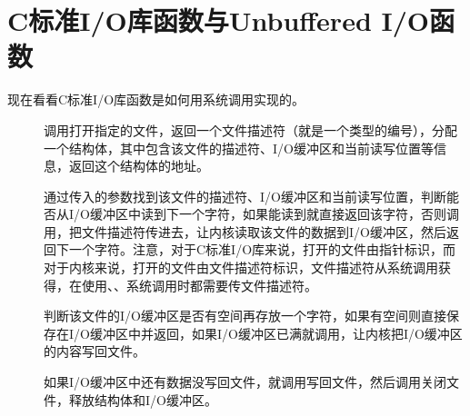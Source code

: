 


\section{C标准I/O库函数与Unbuffered I/O函数}
%
现在看看C标准I/\BookSplit{}O库函数是如何用系统调用实现的。


\begin{description}
\item[{}]


调用打开指定的文件，返回一个文件描述符（就是一个类型的编号），分配一个结构体，其中包含该文件的描述符、I/\BookSplit{}O缓冲区和当前读写位置等信息，返回这个结构体的地址。

\item[{}]


通过传入的参数找到该文件的描述符、I/\BookSplit{}O缓冲区和当前读写位置，判断能否从I/\BookSplit{}O缓冲区中读到下一个字符，如果能读到就直接返回该字符，否则调用，把文件描述符传进去，让内核读取该文件的数据到I/\BookSplit{}O缓冲区，然后返回下一个字符。注意，对于C标准I/\BookSplit{}O库来说，打开的文件由指针标识，而对于内核来说，打开的文件由文件描述符标识，文件描述符从系统调用获得，在使用、、系统调用时都需要传文件描述符。

\item[{}]


判断该文件的I/\BookSplit{}O缓冲区是否有空间再存放一个字符，如果有空间则直接保存在I/\BookSplit{}O缓冲区中并返回，如果I/\BookSplit{}O缓冲区已满就调用，让内核把I/\BookSplit{}O缓冲区的内容写回文件。

\item[{}]


如果I/\BookSplit{}O缓冲区中还有数据没写回文件，就调用写回文件，然后调用关闭文件，释放结构体和I/\BookSplit{}O缓冲区。


\end{description}


